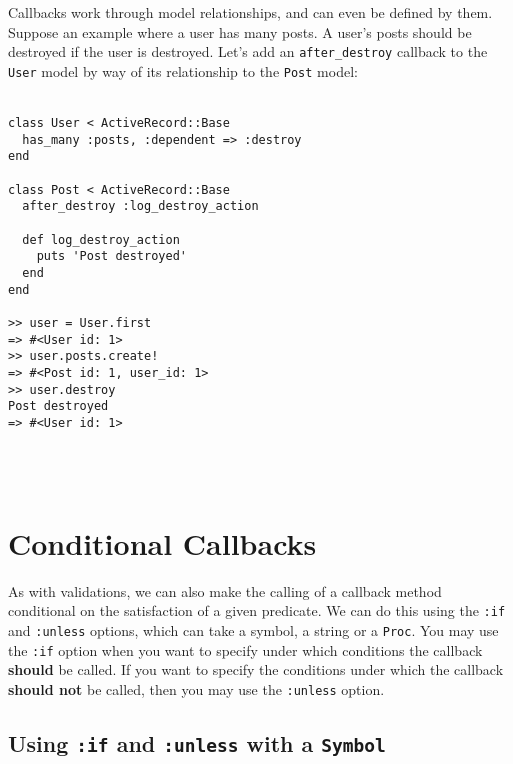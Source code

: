\documentclass[10pt]{book}
\begin{document}
Callbacks work through model relationships, and can even be defined  by them. Suppose an example where a user has many posts. A user’s posts  should be destroyed if the user is destroyed. Let’s add an \texttt{after\_destroy} callback to the \texttt{User} model by way of its relationship to the \texttt{Post} model:
\\ \\
\begin{minipage}{\textwidth}{\scriptsize
\begin{verbatim}
class User < ActiveRecord::Base
  has_many :posts, :dependent => :destroy
end
 
class Post < ActiveRecord::Base
  after_destroy :log_destroy_action
 
  def log_destroy_action
    puts 'Post destroyed'
  end
end
 
>> user = User.first
=> #<User id: 1>
>> user.posts.create!
=> #<Post id: 1, user_id: 1>
>> user.destroy
Post destroyed
=> #<User id: 1>
\end{verbatim}}
\end{minipage}
\\ \\

\section{ Conditional Callbacks}

As with validations, we can also make the calling of a callback  method conditional on the satisfaction of a given predicate. We can do  this using the \texttt{:if} and \texttt{:unless} options, which can take a symbol, a string or a \texttt{Proc}. You may use the \texttt{:if} option when you want to specify under which conditions the callback \textbf{should} be called. If you want to specify the conditions under which the callback \textbf{should not} be called, then you may use the \texttt{:unless} option.

\subsection{ Using \texttt{:if} and \texttt{:unless} with a \texttt{Symbol}}
\end{document}
